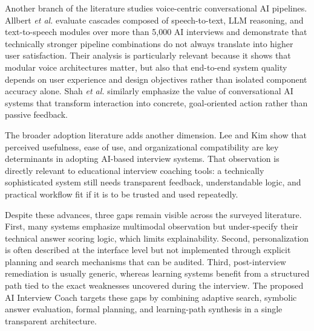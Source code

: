 \documentclass[conference]{IEEEtran}
\begin{document}
Another branch of the literature studies voice-centric conversational AI pipelines. Allbert \textit{et al.} \cite{r2} evaluate cascades composed of speech-to-text, LLM reasoning, and text-to-speech modules over more than 5,000 AI interviews and demonstrate that technically stronger pipeline combinations do not always translate into higher user satisfaction. Their analysis is particularly relevant because it shows that modular voice architectures matter, but also that end-to-end system quality depends on user experience and design objectives rather than isolated component accuracy alone. Shah \textit{et al.} \cite{r3} similarly emphasize the value of conversational AI systems that transform interaction into concrete, goal-oriented action rather than passive feedback.

The broader adoption literature adds another dimension. Lee and Kim \cite{r4} show that perceived usefulness, ease of use, and organizational compatibility are key determinants in adopting AI-based interview systems. That observation is directly relevant to educational interview coaching tools: a technically sophisticated system still needs transparent feedback, understandable logic, and practical workflow fit if it is to be trusted and used repeatedly.

Despite these advances, three gaps remain visible across the surveyed literature. First, many systems emphasize multimodal observation but under-specify their technical answer scoring logic, which limits explainability. Second, personalization is often described at the interface level but not implemented through explicit planning and search mechanisms that can be audited. Third, post-interview remediation is usually generic, whereas learning systems benefit from a structured path tied to the exact weaknesses uncovered during the interview. The proposed AI Interview Coach targets these gaps by combining adaptive search, symbolic answer evaluation, formal planning, and learning-path synthesis in a single transparent architecture.
\end{document}
